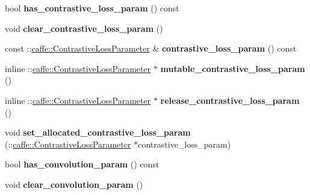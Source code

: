 \begin{DoxyCompactItemize}
bool {\bfseries has\+\_\+contrastive\+\_\+loss\+\_\+param} () const
\item 
\mbox{\label{classcaffe_1_1_layer_parameter_a36ede777e8eb71e2740c4719ac544289}} 
void {\bfseries clear\+\_\+contrastive\+\_\+loss\+\_\+param} ()
\item 
\mbox{\label{classcaffe_1_1_layer_parameter_a0561068904cc7089a51235ba0badb621}} 
const \+::\mbox{\hyperlink{classcaffe_1_1_contrastive_loss_parameter}{caffe\+::\+Contrastive\+Loss\+Parameter}} \& {\bfseries contrastive\+\_\+loss\+\_\+param} () const
\item 
\mbox{\label{classcaffe_1_1_layer_parameter_a5b27b3275d64ab9cd003f9b08102768e}} 
inline \+::\mbox{\hyperlink{classcaffe_1_1_contrastive_loss_parameter}{caffe\+::\+Contrastive\+Loss\+Parameter}} $\ast$ {\bfseries mutable\+\_\+contrastive\+\_\+loss\+\_\+param} ()
\item 
\mbox{\label{classcaffe_1_1_layer_parameter_a0b83b7fb897ed3aa0a94bf76245b1bc0}} 
inline \+::\mbox{\hyperlink{classcaffe_1_1_contrastive_loss_parameter}{caffe\+::\+Contrastive\+Loss\+Parameter}} $\ast$ {\bfseries release\+\_\+contrastive\+\_\+loss\+\_\+param} ()
\item 
\mbox{\label{classcaffe_1_1_layer_parameter_aa0c1b6177cee4f948a017b3299b91540}} 
void {\bfseries set\+\_\+allocated\+\_\+contrastive\+\_\+loss\+\_\+param} (\+::\mbox{\hyperlink{classcaffe_1_1_contrastive_loss_parameter}{caffe\+::\+Contrastive\+Loss\+Parameter}} $\ast$contrastive\+\_\+loss\+\_\+param)
\item 
\mbox{\label{classcaffe_1_1_layer_parameter_a9625833bee86b982a2ac2d22edf2dc8f}} 
bool {\bfseries has\+\_\+convolution\+\_\+param} () const
\item 
\mbox{\label{classcaffe_1_1_layer_parameter_a2741c6e333854ef356f057fe41712c44}} 
void {\bfseries clear\+\_\+convolution\+\_\+param} ()
\item 
\mbox{\label{classcaffe_1_1_layer_parameter_a46a04e864316cb6ec49dbd2f2cdce155}} 

\end{DoxyCompactItemize}
